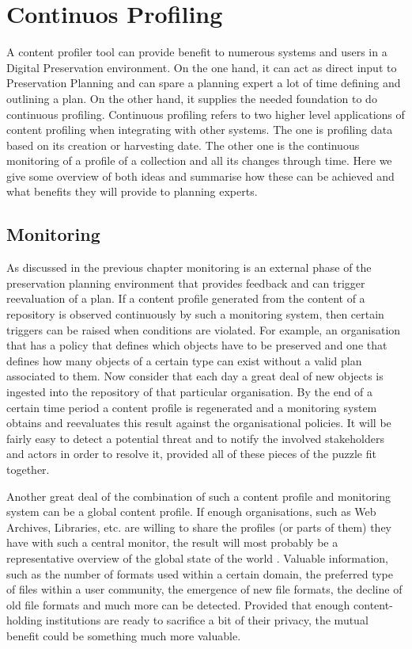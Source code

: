 \section{Continuos Profiling}
A content profiler tool can provide benefit to numerous systems and users in a Digital Preservation environment. On the one hand, it can act as direct input to Preservation Planning and can spare a planning expert a lot of time defining and outlining a plan. On the other hand, it supplies the needed foundation to do continuous profiling. Continuous profiling refers to two higher level applications of content profiling when integrating with other systems. The one is profiling data based on its creation or harvesting date. The other one is the continuous monitoring of a profile of a collection and all its changes through time. Here we give some overview of both ideas and summarise how these can be achieved and what benefits they will provide to planning experts.

\subsection{Monitoring}
As discussed in the previous chapter monitoring is an external phase of the preservation planning environment that provides feedback and can trigger reevaluation of a plan. If a content profile generated from the content of a repository is observed continuously by such a monitoring system, then certain triggers can be raised when conditions are violated.
For example, an organisation that has a policy that defines which objects have to be preserved and one that defines how many objects of a certain type can exist without a valid plan associated to them. Now consider that each day a great deal of new objects is ingested into the repository of that particular organisation. By the end of a certain time period a content profile is regenerated and a monitoring system obtains and reevaluates this result against the organisational policies. It will be fairly easy to detect a potential threat and to notify the involved stakeholders and actors in order to resolve it, provided all of these pieces of the puzzle fit together.

Another great deal of the combination of such a content profile and monitoring system can be a global content profile. If enough organisations, such as Web Archives, Libraries, etc. are willing to share the profiles (or parts of them) they have with such a central monitor, the result will most probably be a representative overview of the global state of the world \cite{becker-ipres2012}. Valuable information, such as the number of formats used within a certain domain, the preferred type of files within a user community, the emergence of new file formats, the decline of old file formats and much more can be detected. Provided that enough content-holding institutions are ready to sacrifice a bit of their privacy, the mutual benefit could be something much more valuable.


